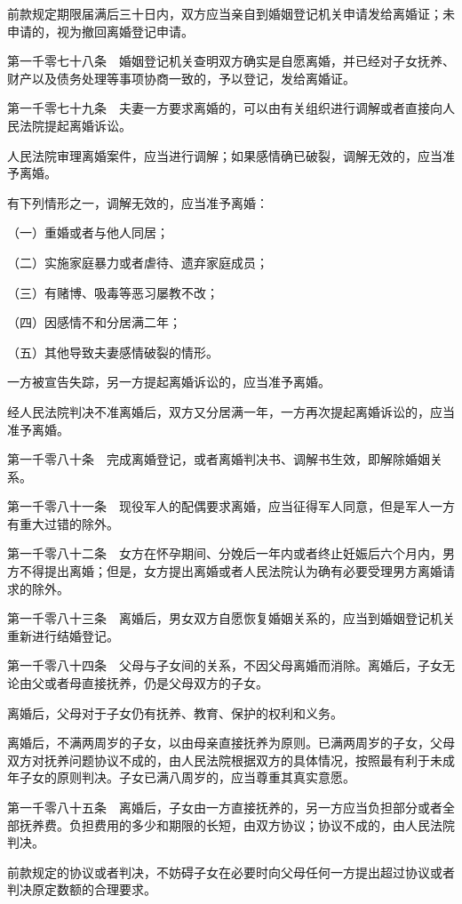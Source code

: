\documentclass[UTF8,12pt,a4paper]{ctexbook}
\begin{document}
前款规定期限届满后三十日内，双方应当亲自到婚姻登记机关申请发给离婚证；未申请的，视为撤回离婚登记申请。

第一千零七十八条　婚姻登记机关查明双方确实是自愿离婚，并已经对子女抚养、财产以及债务处理等事项协商一致的，予以登记，发给离婚证。

第一千零七十九条　夫妻一方要求离婚的，可以由有关组织进行调解或者直接向人民法院提起离婚诉讼。

人民法院审理离婚案件，应当进行调解；如果感情确已破裂，调解无效的，应当准予离婚。

有下列情形之一，调解无效的，应当准予离婚：

（一）重婚或者与他人同居；

（二）实施家庭暴力或者虐待、遗弃家庭成员；

（三）有赌博、吸毒等恶习屡教不改；

（四）因感情不和分居满二年；

（五）其他导致夫妻感情破裂的情形。

一方被宣告失踪，另一方提起离婚诉讼的，应当准予离婚。

经人民法院判决不准离婚后，双方又分居满一年，一方再次提起离婚诉讼的，应当准予离婚。

第一千零八十条　完成离婚登记，或者离婚判决书、调解书生效，即解除婚姻关系。

第一千零八十一条　现役军人的配偶要求离婚，应当征得军人同意，但是军人一方有重大过错的除外。

第一千零八十二条　女方在怀孕期间、分娩后一年内或者终止妊娠后六个月内，男方不得提出离婚；但是，女方提出离婚或者人民法院认为确有必要受理男方离婚请求的除外。

第一千零八十三条　离婚后，男女双方自愿恢复婚姻关系的，应当到婚姻登记机关重新进行结婚登记。

第一千零八十四条　父母与子女间的关系，不因父母离婚而消除。离婚后，子女无论由父或者母直接抚养，仍是父母双方的子女。

离婚后，父母对于子女仍有抚养、教育、保护的权利和义务。

离婚后，不满两周岁的子女，以由母亲直接抚养为原则。已满两周岁的子女，父母双方对抚养问题协议不成的，由人民法院根据双方的具体情况，按照最有利于未成年子女的原则判决。子女已满八周岁的，应当尊重其真实意愿。

第一千零八十五条　离婚后，子女由一方直接抚养的，另一方应当负担部分或者全部抚养费。负担费用的多少和期限的长短，由双方协议；协议不成的，由人民法院判决。

前款规定的协议或者判决，不妨碍子女在必要时向父母任何一方提出超过协议或者判决原定数额的合理要求。
\end{document}

